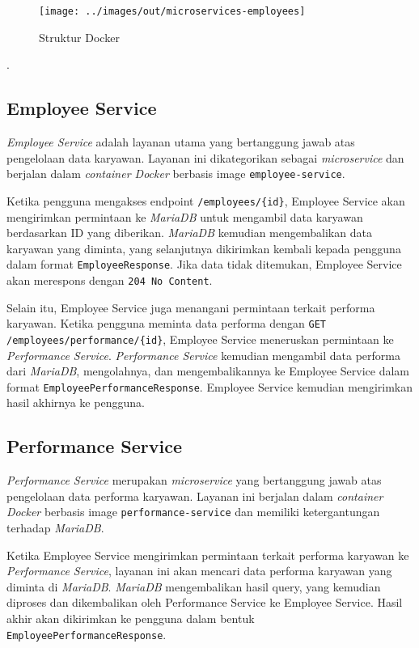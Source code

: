 \begin{figure}[h]
	\centering
	\texttt{[image: ../images/out/microservices-employees]}
	\caption{Struktur Docker}
	\label{fig:employee_performance}
\end{figure}


.

\subsection{Employee Service}

\textit{Employee Service} adalah layanan utama yang bertanggung jawab atas pengelolaan data karyawan. Layanan ini dikategorikan sebagai \textit{microservice} dan berjalan dalam \textit{container Docker} berbasis image \texttt{employee-service}. 

Ketika pengguna mengakses endpoint \texttt{/employees/\{id\}}, Employee Service akan mengirimkan permintaan ke \textit{MariaDB} untuk mengambil data karyawan berdasarkan ID yang diberikan. \textit{MariaDB} kemudian mengembalikan data karyawan yang diminta, yang selanjutnya dikirimkan kembali kepada pengguna dalam format \texttt{EmployeeResponse}. Jika data tidak ditemukan, Employee Service akan merespons dengan \texttt{204 No Content}.

Selain itu, Employee Service juga menangani permintaan terkait performa karyawan. Ketika pengguna meminta data performa dengan \texttt{GET /employees/performance/\{id\}}, Employee Service meneruskan permintaan ke \textit{Performance Service}. \textit{Performance Service} kemudian mengambil data performa dari \textit{MariaDB}, mengolahnya, dan mengembalikannya ke Employee Service dalam format \texttt{EmployeePerformanceResponse}. Employee Service kemudian mengirimkan hasil akhirnya ke pengguna.

\subsection{Performance Service}

\textit{Performance Service} merupakan \textit{microservice} yang bertanggung jawab atas pengelolaan data performa karyawan. Layanan ini berjalan dalam \textit{container Docker} berbasis image \texttt{performance-service} dan memiliki ketergantungan terhadap \textit{MariaDB}.

Ketika Employee Service mengirimkan permintaan terkait performa karyawan ke \textit{Performance Service}, layanan ini akan mencari data performa karyawan yang diminta di \textit{MariaDB}. \textit{MariaDB} mengembalikan hasil query, yang kemudian diproses dan dikembalikan oleh Performance Service ke Employee Service. Hasil akhir akan dikirimkan ke pengguna dalam bentuk \texttt{EmployeePerformanceResponse}.


